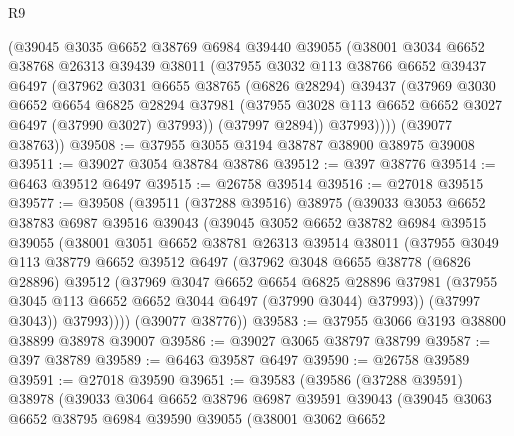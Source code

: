 \begin{lexlean}{R9}
\begin{coremodule}
        (@39045
          @3035
          @6652
          @38769
          @6984
          @39440
          @39055
          (@38001
            @3034
            @6652
            @38768
            @26313
            @39439
            @38011
            (@37955
              @3032
              @113
              @38766
              @6652
              @39437
              @6497
              (@37962
                @3031
                @6655
                @38765
                (@6826 @28294)
                @39437
                (@37969
                  @3030
                  @6652
                  @6654
                  @6825
                  @28294
                  @37981
                  (@37955 @3028 @113 @6652 @6652 @3027 @6497 (@37990 @3027) @37993))
                (@37997 @2894))
              @37993))))
      (@39077 @38763))
@39508 := @37955 @3055 @3194 @38787 @38900 @38975 @39008
@39511 := @39027 @3054 @38784 @38786
@39512 := @397 @38776
@39514 := @6463 @39512 @6497
@39515 := @26758 @39514
@39516 := @27018 @39515
@39577 := @39508
    (@39511
      (@37288 @39516)
      @38975
      (@39033
        @3053
        @6652
        @38783
        @6987
        @39516
        @39043
        (@39045
          @3052
          @6652
          @38782
          @6984
          @39515
          @39055
          (@38001
            @3051
            @6652
            @38781
            @26313
            @39514
            @38011
            (@37955
              @3049
              @113
              @38779
              @6652
              @39512
              @6497
              (@37962
                @3048
                @6655
                @38778
                (@6826 @28896)
                @39512
                (@37969
                  @3047
                  @6652
                  @6654
                  @6825
                  @28896
                  @37981
                  (@37955 @3045 @113 @6652 @6652 @3044 @6497 (@37990 @3044) @37993))
                (@37997 @3043))
              @37993))))
      (@39077 @38776))
@39583 := @37955 @3066 @3193 @38800 @38899 @38978 @39007
@39586 := @39027 @3065 @38797 @38799
@39587 := @397 @38789
@39589 := @6463 @39587 @6497
@39590 := @26758 @39589
@39591 := @27018 @39590
@39651 := @39583
    (@39586
      (@37288 @39591)
      @38978
      (@39033
        @3064
        @6652
        @38796
        @6987
        @39591
        @39043
        (@39045
          @3063
          @6652
          @38795
          @6984
          @39590
          @39055
          (@38001
            @3062
            @6652

\end{coremodule}
\end{lexlean}
